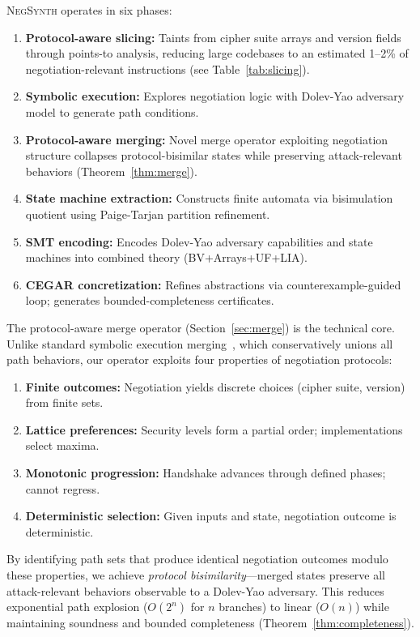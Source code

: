 \documentclass[10pt,twocolumn]{article}
\begin{document}
\textsc{NegSynth} operates in six phases:
\begin{enumerate}[leftmargin=*,noitemsep]
\item \textbf{Protocol-aware slicing:} Taints from cipher suite arrays and version fields through points-to analysis, reducing large codebases to an estimated 1--2\% of negotiation-relevant instructions (see Table~\ref{tab:slicing}).
\item \textbf{Symbolic execution:} Explores negotiation logic with Dolev-Yao adversary model to generate path conditions.
\item \textbf{Protocol-aware merging:} Novel merge operator exploiting negotiation structure collapses protocol-bisimilar states while preserving attack-relevant behaviors (Theorem~\ref{thm:merge}).
\item \textbf{State machine extraction:} Constructs finite automata via bisimulation quotient using Paige-Tarjan partition refinement.
\item \textbf{SMT encoding:} Encodes Dolev-Yao adversary capabilities and state machines into combined theory (BV+Arrays+UF+LIA).
\item \textbf{CEGAR concretization:} Refines abstractions via counterexample-guided loop; generates bounded-completeness certificates.
\end{enumerate}

The protocol-aware merge operator (Section~\ref{sec:merge}) is the technical core. Unlike standard symbolic execution merging~\cite{kuznetsov2012efficient}, which conservatively unions all path behaviors, our operator exploits four properties of negotiation protocols:

\begin{enumerate}[leftmargin=*,noitemsep]
\item \textbf{Finite outcomes:} Negotiation yields discrete choices (cipher suite, version) from finite sets.
\item \textbf{Lattice preferences:} Security levels form a partial order; implementations select maxima.
\item \textbf{Monotonic progression:} Handshake advances through defined phases; cannot regress.
\item \textbf{Deterministic selection:} Given inputs and state, negotiation outcome is deterministic.
\end{enumerate}

\noindent By identifying path sets that produce identical negotiation outcomes modulo these properties, we achieve \emph{protocol bisimilarity}—merged states preserve all attack-relevant behaviors observable to a Dolev-Yao adversary. This reduces exponential path explosion ($O(2^n)$ for $n$ branches) to linear ($O(n)$) while maintaining soundness and bounded completeness (Theorem~\ref{thm:completeness}).
\end{document}
